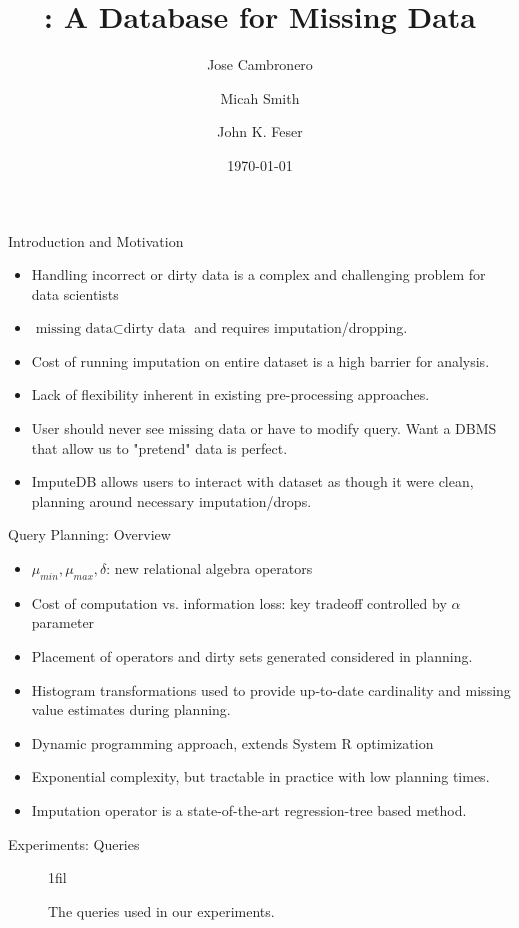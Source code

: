 \documentclass{beamer}
\title{\ProjectName{}: A Database for Missing Data}
\author{Jose Cambronero \and Micah Smith \and John K. Feser}
\institute{MIT}
\date{\today{}}
\makeatletter
\newcommand*{\centerfloat}{%
  \parindent \z@
  \leftskip \z@ \@plus 1fil \@minus \textwidth
  \rightskip\leftskip
  \parfillskip \z@skip}
\newcommand{\ProjectName}{ImputeDB}
\makeatother
\begin{document}
\frame{\titlepage}

\begin{frame}{Introduction and Motivation}
\begin{itemize}
	\item Handling incorrect or dirty data is a complex and challenging problem for data scientists
	\item $\text{missing data} \subset \text{dirty data}$ and requires imputation/dropping.
	\item Cost of running imputation on entire dataset is a high barrier for analysis.
	\item Lack of flexibility inherent in existing pre-processing approaches.
	\item User should never see missing data or have to modify query. Want a DBMS that 
		allow us to "pretend" data is perfect.
	\item \ProjectName{} allows users to interact with dataset as though it were clean, planning
	around necessary imputation/drops.
\end{itemize}
\end{frame}

\begin{frame}[fragile]{Query Planning: Overview}
\begin{itemize}
	\item $\mu_{min}, \mu_{max}, \delta$: new relational algebra operators
	\item Cost of computation vs. information loss: key tradeoff controlled by $\alpha$ parameter
	\item Placement of operators and dirty sets generated considered in planning.
	\item Histogram transformations used to provide up-to-date cardinality and missing value estimates during planning.
	\item Dynamic programming approach, extends System R optimization\cite{blasgen1981system}
	\item Exponential complexity, but tractable in practice with low planning times.
	\item Imputation operator is a state-of-the-art regression-tree based method.
\end{itemize}
\end{frame}

\begin{frame}[fragile]{Experiments: Queries}
\begin{figure}
  \centerfloat
  \tiny
  
  \caption{The queries used in our experiments.}
  \label{fig:queries}
\end{figure}
\end{frame}
\end{document}
